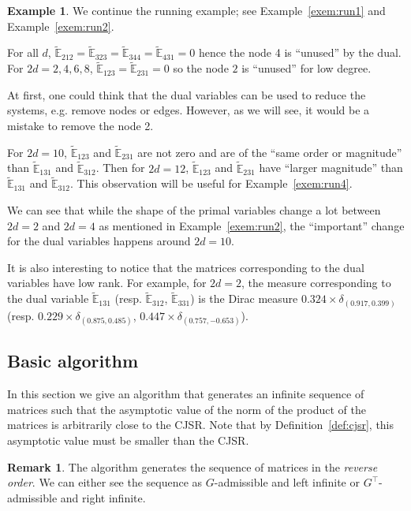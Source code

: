 \documentclass{sig-alternate-05-2015}
\newcommand{\1}{\mathbf{1}}
\theoremstyle{definition}
\newtheorem{myexem}{Example}
\newtheorem{myrem}{Remark}
\newcommand{\Tr}{\top}
\newcommand{\G}{G}
\newcommand{\pE}{\widetilde{\mathbb{E}}}
\begin{document}
\begin{myexem}
  \label{exem:run3}
  We continue the running example; see Example~\ref{exem:run1} and Example~\ref{exem:run2}.

  For all $d$, $\pE_{212} = \pE_{323} = \pE_{344} = \pE_{431} = 0$
  hence the node 4 is ``unused'' by the dual.
  For $2d = 2, 4, 6, 8$, $\pE_{123} = \pE_{231} = 0$ so
  the node $2$ is ``unused'' for low degree.

  At first, one could think that the dual variables can be used to reduce the systems,
  e.g. remove nodes or edges.
  However, as we will see, it would be a mistake to remove the node 2.

  For $2d = 10$, $\pE_{123}$ and $\pE_{231}$ are not zero and are of the ``same order or magnitude'' than $\pE_{131}$ and $\pE_{312}$.
  Then for $2d = 12$, $\pE_{123}$ and $\pE_{231}$ have ``larger magnitude'' than $\pE_{131}$ and $\pE_{312}$.
  This observation will be useful for Example~\ref{exem:run4}.

  We can see that while the shape of the primal variables change a lot between $2d = 2$ and $2d = 4$ as mentioned in Example~\ref{exem:run2},
  the ``important'' change for the dual variables happens around $2d = 10$.

  It is also interesting to notice that the matrices corresponding to the dual variables have low rank.
  For example, for $2d = 2$, the measure corresponding to the dual variable $\pE_{131}$
  (resp. $\pE_{312}$, $\pE_{331}$) is the Dirac measure $0.324 \times \delta_{(0.917,0.399)}$
  (resp. $0.229 \times \delta_{(0.875,0.485)}$, $0.447 \times \delta_{(0.757,-0.653)}$).
\end{myexem}

\subsection{Basic algorithm}
\label{sec:seq}
In this section we give an algorithm that generates an infinite sequence of matrices such that
the asymptotic value of the norm of the product of the matrices is arbitrarily close to the CJSR.
Note that by Definition~\ref{def:cjsr}, this asymptotic value must be smaller than the CJSR.

\begin{myrem}
  The algorithm generates the sequence of matrices in the \emph{reverse order}.
  We can either see the sequence as $\G$-admissible and left infinite
  or $\G^\Tr $-admissible and right infinite.
\end{myrem}
\end{document}

